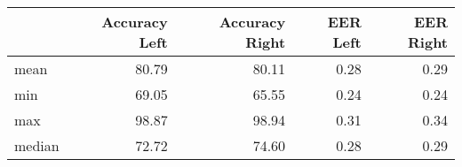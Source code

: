 \begin{tabular}{lrrrr}
\toprule
{} &  Accuracy Left &  Accuracy Right &  EER Left &  EER Right \\
\midrule
mean   &          80.79 &           80.11 &      0.28 &       0.29 \\
min    &          69.05 &           65.55 &      0.24 &       0.24 \\
max    &          98.87 &           98.94 &      0.31 &       0.34 \\
median &          72.72 &           74.60 &      0.28 &       0.29 \\
\bottomrule
\end{tabular}
